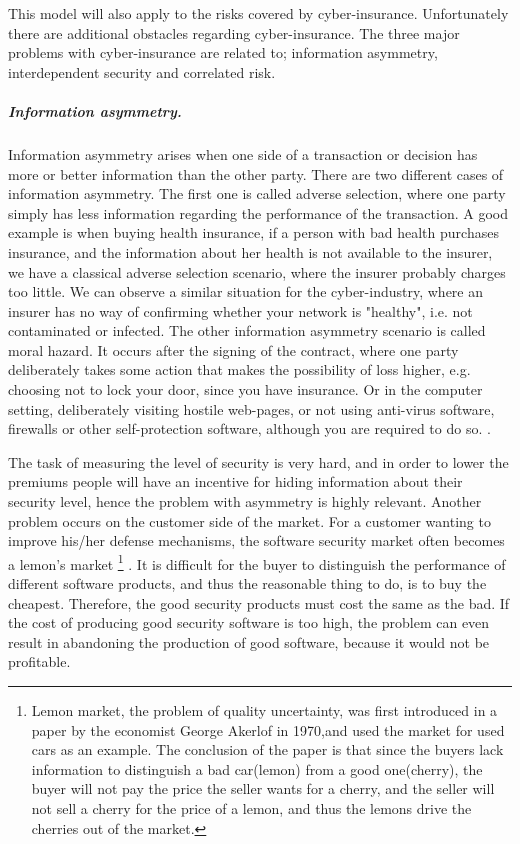 This model will also apply to the risks covered by cyber-insurance. Unfortunately there are additional obstacles regarding cyber-insurance. The three major problems with cyber-insurance are related to; information asymmetry, interdependent security and correlated risk. 
 
\subparagraph{Information asymmetry.}
Information asymmetry arises when one side of a transaction or decision has more or better information than the other party. There are two different cases of information asymmetry. The first one is called adverse selection, where one party simply has less information regarding the performance of the transaction. A good example is when buying health insurance, if a person with bad health purchases insurance, and the information about her health is not available to the insurer, we have a classical adverse selection scenario, where the insurer probably charges too little. We can observe a similar situation for the cyber-industry, where an insurer has no way of confirming whether your network is "healthy", i.e. not contaminated or infected. 
The other information asymmetry scenario is called moral hazard. It occurs after the signing of the contract, where one party deliberately takes some action that makes the possibility of loss higher, e.g. choosing not to lock your door, since you have insurance. Or in the computer setting, deliberately visiting hostile web-pages, or not using anti-virus software, firewalls or other self-protection software, although you are required to do so. \cite{solutiontoinfoasym}.
    
    
The task of measuring the level of security is very hard, and in order to lower the premiums people will have an incentive for hiding information about their security level, hence the problem with asymmetry is highly relevant. Another problem occurs on the customer side of the market. For a customer wanting to improve his/her defense mechanisms, the software security market often becomes a lemon's market
\footnote{Lemon market, the problem of quality uncertainty, was first introduced in a paper \cite{lemonpaper} by the economist George Akerlof in 1970,and used the market for used cars as an example.\cite{lemon} The conclusion of the paper is that since the buyers lack information to distinguish a bad car(lemon) from a good one(cherry), the buyer will not pay the price the seller wants for a cherry, and the seller will not sell a cherry for the price of a lemon, and thus the lemons drive the cherries out of the market.}
. 
It is difficult for the buyer to distinguish the performance of different software products, and thus the reasonable thing to do, is to buy the cheapest. Therefore, the good security products must cost the same as the bad. If the cost of producing good security software is too high, the problem can even result in abandoning the production of good software, because it would not be profitable.

